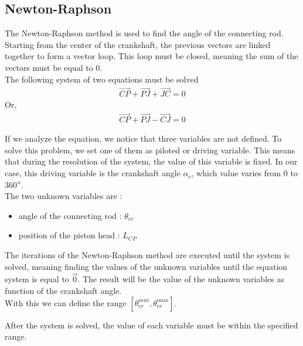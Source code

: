 \documentclass[12pt,a4paper]{article}
\begin{document}
	\subsection{Newton-Raphson}
	The Newton-Raphson method is used to find the angle of the connecting rod. \\
	Starting from the center of the crankshaft, the previous vectors are linked together to form a vector loop. This loop must be closed, meaning the sum of the vectors must be equal to 0.\\	
	
	The following system of two equations must be solved
	\begin{eqnarray}
		\vec{CP} + \vec{PJ} + \vec{JC} = 0
	\end{eqnarray} 
	Or, 
	\begin{eqnarray}
		\vec{CP} + \vec{PJ} - \vec{CJ} = 0
	\end{eqnarray} 
	
	If we analyze the equation, we notice that three variables are not defined. To solve this problem, we set one of them as piloted or driving variable. This means that during the resolution of the system, the value of this variable is fixed. In our case, this driving variable is the crankshaft angle $\alpha_c$, which value varies from 0 to 360$\degree$.\\
	
	The two unknown variables are : 
	\begin{itemize}
		\item angle of the connecting rod : $\theta_{cr}$
		\item position of the piston head : $L_{CP}$
	\end{itemize}
	The iterations of the Newton-Raphson method are executed until the system is solved, meaning finding the values of the unknown variables until the equation system is equal to $\vec{0}$. The result will be the value of the unknown variables as function of the crankshaft angle. \\
		
	With this we can define the range $[\theta_{cr}^{min}, \theta_{cr}^{max}]$. 
	
	After the system is solved, the value of each variable must be within the specified range. 
	 
\end{document}
